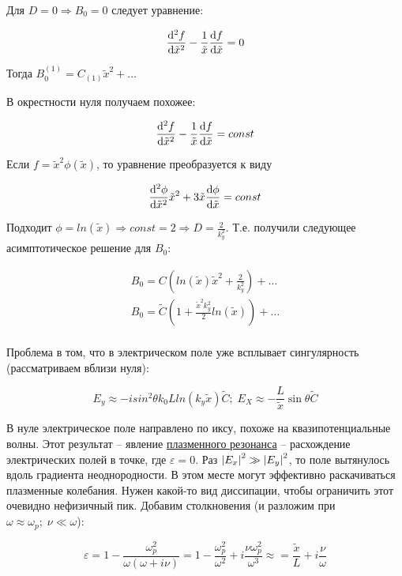 \documentclass[10pt, a4paper]{article}
\begin{document}
Для $D = 0 \Rightarrow B_0 = 0$ следует уравнение:

\begin{equation*}
	\dv[2]{f}{\tilde{x}} - \frac{1}{\tilde{x}}\dv{f}{\tilde{x}} = 0
\end{equation*}

Тогда $B_0^{(1)} = C_{(1)}\tilde{x}^2+\ldots$

В окрестности нуля получаем похожее:

\begin{equation*}
	\dv[2]{f}{\tilde{x}} - \frac{1}{\tilde{x}}\dv{f}{\tilde{x}} = const
\end{equation*}

Если $f = \tilde{x}^2\phi(\tilde{x})$, то уравнение преобразуется к виду

\begin{equation*}
	\dv[2]{\phi}{\tilde{x}}\tilde{x}^2 + 3\tilde{x}\dv{\phi}{\tilde{x}} = const
\end{equation*}

Подходит $\phi = ln(\tilde{x}) \Rightarrow const = 2 \Rightarrow D = \frac{2}{k_y^2}$. Т.е. получили следующее асимптотическое решение для $B_0$:

\begin{align*}
	B_0 = C\left(ln(\tilde{x})\tilde{x}^2 + \frac{2}{k_y^2}\right)+\ldots \\
	B_0 = \tilde{C}\left(1 + \frac{\tilde{x}^2k_y^2}{2} ln(\tilde{x})\right)+\ldots \\
\end{align*}

Проблема в том, что в электрическом поле уже всплывает сингулярность (рассматриваем вблизи нуля):

\begin{equation*}
	E_y \approx -isin^2\theta k_0L ln(k_y\tilde{x})\tilde{C};\;E_X\approx-\frac{L}{\tilde{x}}\sin\theta\tilde{C}
\end{equation*}

В нуле электрическое поле направлено по иксу, похоже на квазипотенциальные волны. Этот результат -- явление \uline{плазменного резонанса} -- расхождение электрических полей в точке, где $\varepsilon = 0$. Раз $\abs{E_x}^2\gg\abs{E_y}^2$, то поле вытянулось вдоль градиента неоднородности. В этом месте могут эффективно раскачиваться плазменные колебания. Нужен какой-то вид диссипации, чтобы ограничить этот очевидно нефизичный пик. Добавим столкновения (и разложим при $\omega\approx\omega_p;\;\nu\ll\omega$):

\begin{equation*}
	\varepsilon = 1-\frac{\omega_p^2}{\omega(\omega+i\nu)} = 1 - \frac{\omega_p^2}{\omega^2}+i\frac{\nu\omega_p^2}{\omega^3}\approx = \frac{\tilde{x}}{L}+i\frac{\nu}{\omega}
\end{equation*}
\end{document}
